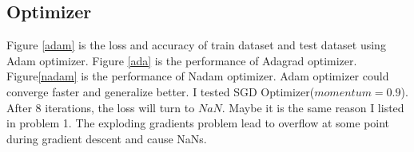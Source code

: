 \documentclass{article}
\begin{document}
\subsection{Optimizer}
Figure \ref{adam} is the loss and accuracy of train dataset and test dataset using Adam optimizer. Figure \ref{ada} is the performance of Adagrad optimizer. Figure\ref{nadam} is the performance of Nadam optimizer. Adam optimizer could converge faster and generalize better. I tested SGD Optimizer($momentum=0.9$). After 8 iterations, the loss will turn to $NaN$. Maybe it is the same reason I listed in problem 1. The exploding gradients problem lead to overflow at some point during gradient descent and cause NaNs.

\begin{figure}[!h]
\quad
{}
\end{figure}
\end{document}

